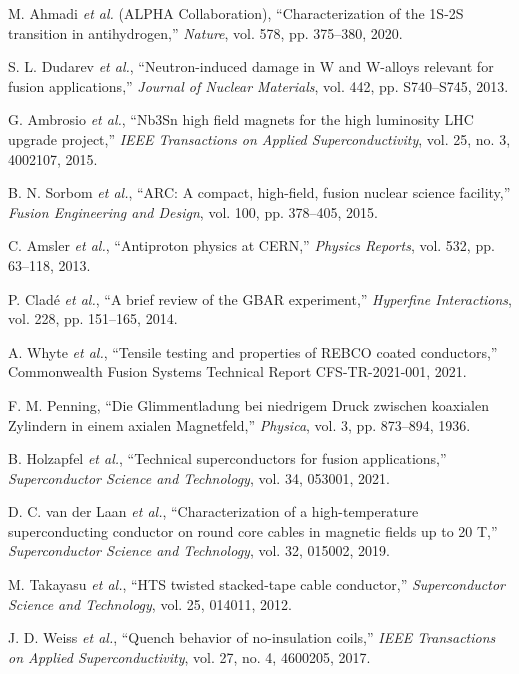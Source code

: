 \documentclass[10pt,twocolumn]{article}
\begin{document}
\begin{thebibliography}{25}
M. Ahmadi \emph{et al.} (ALPHA Collaboration), ``Characterization of the 1S-2S transition in antihydrogen,'' \textit{Nature}, vol. 578, pp. 375--380, 2020.

S. L. Dudarev \emph{et al.}, ``Neutron-induced damage in W and W-alloys relevant for fusion applications,'' \textit{Journal of Nuclear Materials}, vol. 442, pp. S740--S745, 2013.

G. Ambrosio \emph{et al.}, ``Nb3Sn high field magnets for the high luminosity LHC upgrade project,'' \textit{IEEE Transactions on Applied Superconductivity}, vol. 25, no. 3, 4002107, 2015.

B. N. Sorbom \emph{et al.}, ``ARC: A compact, high-field, fusion nuclear science facility,'' \textit{Fusion Engineering and Design}, vol. 100, pp. 378--405, 2015.

C. Amsler \emph{et al.}, ``Antiproton physics at CERN,'' \textit{Physics Reports}, vol. 532, pp. 63--118, 2013.

P. Cladé \emph{et al.}, ``A brief review of the GBAR experiment,'' \textit{Hyperfine Interactions}, vol. 228, pp. 151--165, 2014.

A. Whyte \emph{et al.}, ``Tensile testing and properties of REBCO coated conductors,'' Commonwealth Fusion Systems Technical Report CFS-TR-2021-001, 2021.

F. M. Penning, ``Die Glimmentladung bei niedrigem Druck zwischen koaxialen Zylindern in einem axialen Magnetfeld,'' \textit{Physica}, vol. 3, pp. 873--894, 1936.

B. Holzapfel \emph{et al.}, ``Technical superconductors for fusion applications,'' \textit{Superconductor Science and Technology}, vol. 34, 053001, 2021.

D. C. van der Laan \emph{et al.}, ``Characterization of a high-temperature superconducting conductor on round core cables in magnetic fields up to 20 T,'' \textit{Superconductor Science and Technology}, vol. 32, 015002, 2019.

M. Takayasu \emph{et al.}, ``HTS twisted stacked-tape cable conductor,'' \textit{Superconductor Science and Technology}, vol. 25, 014011, 2012.

J. D. Weiss \emph{et al.}, ``Quench behavior of no-insulation coils,'' \textit{IEEE Transactions on Applied Superconductivity}, vol. 27, no. 4, 4600205, 2017.

\end{thebibliography}
\end{document}
